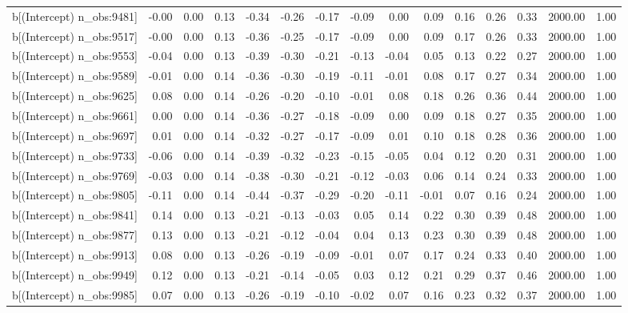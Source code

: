 \begin{table}[ht]
\begin{tabular}{rrrrrrrrrrrrrrr}
  b[(Intercept) n\_obs:9481] & -0.00 & 0.00 & 0.13 & -0.34 & -0.26 & -0.17 & -0.09 & 0.00 & 0.09 & 0.16 & 0.26 & 0.33 & 2000.00 & 1.00 \\ 
  b[(Intercept) n\_obs:9517] & -0.00 & 0.00 & 0.13 & -0.36 & -0.25 & -0.17 & -0.09 & 0.00 & 0.09 & 0.17 & 0.26 & 0.33 & 2000.00 & 1.00 \\ 
  b[(Intercept) n\_obs:9553] & -0.04 & 0.00 & 0.13 & -0.39 & -0.30 & -0.21 & -0.13 & -0.04 & 0.05 & 0.13 & 0.22 & 0.27 & 2000.00 & 1.00 \\ 
  b[(Intercept) n\_obs:9589] & -0.01 & 0.00 & 0.14 & -0.36 & -0.30 & -0.19 & -0.11 & -0.01 & 0.08 & 0.17 & 0.27 & 0.34 & 2000.00 & 1.00 \\ 
  b[(Intercept) n\_obs:9625] & 0.08 & 0.00 & 0.14 & -0.26 & -0.20 & -0.10 & -0.01 & 0.08 & 0.18 & 0.26 & 0.36 & 0.44 & 2000.00 & 1.00 \\ 
  b[(Intercept) n\_obs:9661] & 0.00 & 0.00 & 0.14 & -0.36 & -0.27 & -0.18 & -0.09 & 0.00 & 0.09 & 0.18 & 0.27 & 0.35 & 2000.00 & 1.00 \\ 
  b[(Intercept) n\_obs:9697] & 0.01 & 0.00 & 0.14 & -0.32 & -0.27 & -0.17 & -0.09 & 0.01 & 0.10 & 0.18 & 0.28 & 0.36 & 2000.00 & 1.00 \\ 
  b[(Intercept) n\_obs:9733] & -0.06 & 0.00 & 0.14 & -0.39 & -0.32 & -0.23 & -0.15 & -0.05 & 0.04 & 0.12 & 0.20 & 0.31 & 2000.00 & 1.00 \\ 
  b[(Intercept) n\_obs:9769] & -0.03 & 0.00 & 0.14 & -0.38 & -0.30 & -0.21 & -0.12 & -0.03 & 0.06 & 0.14 & 0.24 & 0.33 & 2000.00 & 1.00 \\ 
  b[(Intercept) n\_obs:9805] & -0.11 & 0.00 & 0.14 & -0.44 & -0.37 & -0.29 & -0.20 & -0.11 & -0.01 & 0.07 & 0.16 & 0.24 & 2000.00 & 1.00 \\ 
  b[(Intercept) n\_obs:9841] & 0.14 & 0.00 & 0.13 & -0.21 & -0.13 & -0.03 & 0.05 & 0.14 & 0.22 & 0.30 & 0.39 & 0.48 & 2000.00 & 1.00 \\ 
  b[(Intercept) n\_obs:9877] & 0.13 & 0.00 & 0.13 & -0.21 & -0.12 & -0.04 & 0.04 & 0.13 & 0.23 & 0.30 & 0.39 & 0.48 & 2000.00 & 1.00 \\ 
  b[(Intercept) n\_obs:9913] & 0.08 & 0.00 & 0.13 & -0.26 & -0.19 & -0.09 & -0.01 & 0.07 & 0.17 & 0.24 & 0.33 & 0.40 & 2000.00 & 1.00 \\ 
  b[(Intercept) n\_obs:9949] & 0.12 & 0.00 & 0.13 & -0.21 & -0.14 & -0.05 & 0.03 & 0.12 & 0.21 & 0.29 & 0.37 & 0.46 & 2000.00 & 1.00 \\ 
  b[(Intercept) n\_obs:9985] & 0.07 & 0.00 & 0.13 & -0.26 & -0.19 & -0.10 & -0.02 & 0.07 & 0.16 & 0.23 & 0.32 & 0.37 & 2000.00 & 1.00 \\ 

\end{tabular}
\end{table}
